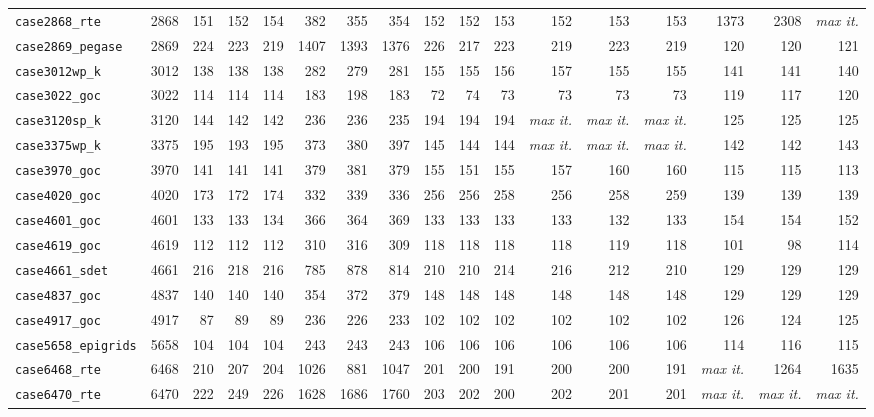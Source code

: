 {\begin{longtable}{lrrrrrrrrrrrrrrrr}
\texttt{case2868\_rte} & 2868 & 151 & 152 & 154 & 382 & 355 & 354 & 152 & 152 & 153 & 152 & 153 & 153 & 1373 & 2308 & \textit{max it.} \\
\texttt{case2869\_pegase} & 2869 & 224 & 223 & 219 & 1407 & 1393 & 1376 & 226 & 217 & 223 & 219 & 223 & 219 & 120 & 120 & 121 \\
\texttt{case3012wp\_k} & 3012 & 138 & 138 & 138 & 282 & 279 & 281 & 155 & 155 & 156 & 157 & 155 & 155 & 141 & 141 & 140 \\
\texttt{case3022\_goc} & 3022 & 114 & 114 & 114 & 183 & 198 & 183 & 72 & 74 & 73 & 73 & 73 & 73 & 119 & 117 & 120 \\
\texttt{case3120sp\_k} & 3120 & 144 & 142 & 142 & 236 & 236 & 235 & 194 & 194 & 194 & \textit{max it.} & \textit{max it.} & \textit{max it.} & 125 & 125 & 125 \\
\texttt{case3375wp\_k} & 3375 & 195 & 193 & 195 & 373 & 380 & 397 & 145 & 144 & 144 & \textit{max it.} & \textit{max it.} & \textit{max it.} & 142 & 142 & 143 \\
\texttt{case3970\_goc} & 3970 & 141 & 141 & 141 & 379 & 381 & 379 & 155 & 151 & 155 & 157 & 160 & 160 & 115 & 115 & 113 \\
\texttt{case4020\_goc} & 4020 & 173 & 172 & 174 & 332 & 339 & 336 & 256 & 256 & 258 & 256 & 258 & 259 & 139 & 139 & 139 \\
\texttt{case4601\_goc} & 4601 & 133 & 133 & 134 & 366 & 364 & 369 & 133 & 133 & 133 & 133 & 132 & 133 & 154 & 154 & 152 \\
\texttt{case4619\_goc} & 4619 & 112 & 112 & 112 & 310 & 316 & 309 & 118 & 118 & 118 & 118 & 119 & 118 & 101 & 98 & 114 \\
\texttt{case4661\_sdet} & 4661 & 216 & 218 & 216 & 785 & 878 & 814 & 210 & 210 & 214 & 216 & 212 & 210 & 129 & 129 & 129 \\
\texttt{case4837\_goc} & 4837 & 140 & 140 & 140 & 354 & 372 & 379 & 148 & 148 & 148 & 148 & 148 & 148 & 129 & 129 & 129 \\
\texttt{case4917\_goc} & 4917 & 87 & 89 & 89 & 236 & 226 & 233 & 102 & 102 & 102 & 102 & 102 & 102 & 126 & 124 & 125 \\
\texttt{case5658\_epigrids} & 5658 & 104 & 104 & 104 & 243 & 243 & 243 & 106 & 106 & 106 & 106 & 106 & 106 & 114 & 116 & 115 \\
\texttt{case6468\_rte} & 6468 & 210 & 207 & 204 & 1026 & 881 & 1047 & 201 & 200 & 191 & 200 & 200 & 191 & \textit{max it.} & 1264 & 1635 \\
\texttt{case6470\_rte} & 6470 & 222 & 249 & 226 & 1628 & 1686 & 1760 & 203 & 202 & 200 & 202 & 201 & 201 & \textit{max it.} & \textit{max it.} & \textit{max it.} \\

\end{longtable}}
